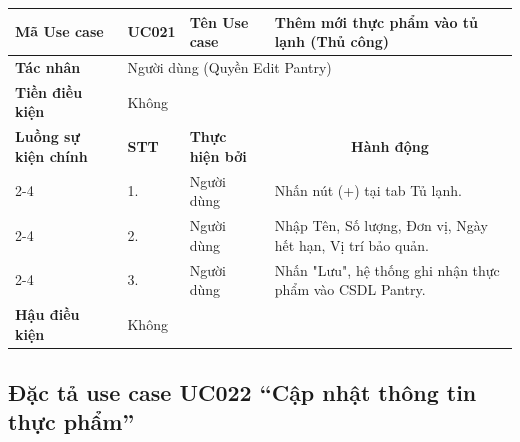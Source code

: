 \documentclass[../main.tex]{subfiles}
\begin{document}
\begin{longtable}{|p{2.7cm}|p{0.8cm}|p{2.6cm}|p{7.3cm}|}
\hline
\cellcolor[HTML]{D5F5E3}\textbf{Mã Use case} & \multicolumn{1}{l|}{UC021} & \cellcolor[HTML]{D5F5E3}\textbf{Tên Use case} & Thêm mới thực phẩm vào tủ lạnh (Thủ công) \\ \hline
\cellcolor[HTML]{D5F5E3}\textbf{Tác nhân} & \multicolumn{3}{p{10.7cm}|}{Người dùng (Quyền Edit Pantry)} \\ \hline
\cellcolor[HTML]{D5F5E3}\textbf{Tiền điều kiện} & \multicolumn{3}{p{10.7cm}|}{Không} \\ \hline

\cellcolor[HTML]{D5F5E3}\textbf{Luồng sự kiện chính} & \cellcolor[HTML]{FDEBD0}\textbf{STT} & \cellcolor[HTML]{FDEBD0}\textbf{Thực hiện bởi} & \multicolumn{1}{c|}{\cellcolor[HTML]{FDEBD0}\textbf{Hành động}} \\ \cline{2-4} 
\cellcolor[HTML]{D5F5E3} & 1. & Người dùng & Nhấn nút (+) tại tab Tủ lạnh. \\ \cline{2-4} 
\cellcolor[HTML]{D5F5E3} & 2. & Người dùng & Nhập Tên, Số lượng, Đơn vị, Ngày hết hạn, Vị trí bảo quản. \\ \cline{2-4} 
\cellcolor[HTML]{D5F5E3} & 3. & Người dùng & Nhấn "Lưu", hệ thống ghi nhận thực phẩm vào CSDL Pantry. \\ \hline

\cellcolor[HTML]{D5F5E3}\textbf{Hậu điều kiện} & \multicolumn{3}{p{10.7cm}|}{Không} \\ \hline
\end{longtable}
\endgroup

\subsection{Đặc tả use case UC022 ``Cập nhật thông tin thực phẩm''}
\vspace{0.5cm}

\begingroup
\renewcommand{\arraystretch}{1.5}
\end{document}
